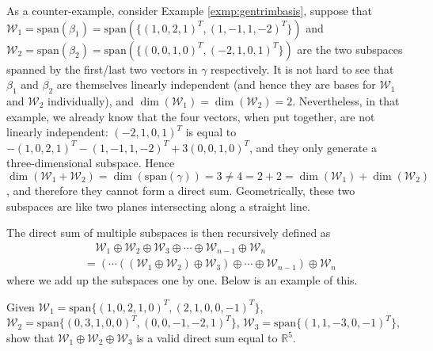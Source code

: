 As a counter-example, consider Example \ref{exmp:gentrimbasis}, suppose that $\mathcal{W}_1 = \text{span}(\mathcal{\beta}_1) = \text{span}(\{(1,0,2,1)^T, (1,-1,1,-2)^T\})$ and $\mathcal{W}_2 = \text{span}(\mathcal{\beta}_2) = \text{span}(\{(0,0,1,0)^T, \allowbreak (-2,1,0,1)^T\})$ are the two subspaces spanned by the first/last two vectors in $\mathcal{\gamma}$ respectively. It is not hard to see that $\mathcal{\beta}_1$ and $\mathcal{\beta}_2$ are themselves linearly independent (and hence they are bases for $\mathcal{W}_1$ and $\mathcal{W}_2$ individually), and $\dim(\mathcal{W}_1) = \dim(\mathcal{W}_2) = 2$. Nevertheless, in that example, we already know that the four vectors, when put together, are not linearly independent: $(-2,1,0,1)^T$ is equal to $-(1,0,2,1)^T-(1,-1,1,-2)^T+3(0,0,1,0)^T$, and they only generate a three-dimensional subspace. Hence $\dim(\mathcal{W}_1 + \mathcal{W}_2) = \dim(\text{span}(\mathcal{\gamma})) = 3 \neq 4 = 2+2 = \dim(\mathcal{W}_1) + \dim(\mathcal{W}_2)$, and therefore they cannot form a direct sum. Geometrically, these two subspaces are like two planes intersecting along a straight line.\par
The direct sum of multiple subspaces is then recursively defined as
\begin{align*}
&\quad \mathcal{W}_1 \oplus \mathcal{W}_2 \oplus \mathcal{W}_3 \oplus \cdots \oplus \mathcal{W}_{n-1} \oplus \mathcal{W}_n \\
&= (\cdots((\mathcal{W}_1 \oplus \mathcal{W}_2) \oplus \mathcal{W}_3) \oplus \cdots \oplus \mathcal{W}_{n-1}) \oplus \mathcal{W}_n
\end{align*}
where we add up the subspaces one by one. Below is an example of this.
\begin{exmp}
\label{exmp:directsum}
Given $\mathcal{W}_1 = \text{span}\{(1,0,2,1,0)^T, (2,1,0,0,-1)^T\}$, $\mathcal{W}_2 = \text{span}\{(0,3,1,0,0)^T, (0,0,-1,-2,1)^T\}$, $\mathcal{W}_3 = \text{span}\{(1,1,-3,0,-1)^T\}$, show that $\mathcal{W}_1 \oplus \mathcal{W}_2 \oplus \mathcal{W}_3$ is a valid direct sum equal to $\mathbb{R}^5$.
\end{exmp}
